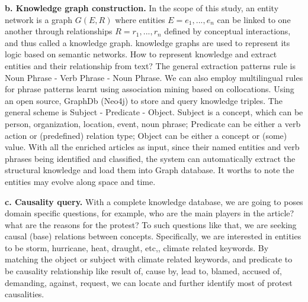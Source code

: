 \documentclass[9pt,twocolumn,twoside]{pnas-new}
\begin{document}
{\textbf{b. Knowledge graph construction.}
In the scope of this study, an entity network is a graph $G(E, R)$ where entities $E = {e_1,
. . ., e_n}$ can be linked to one another through relationships $R = {r_1, . . ., r_n}$ defined by conceptual interactions, and thus called a knowledge graph. knowledge graphs are used to represent its logic based on semantic networks.
How to represent knowledge and extract entities and their relationship from text?
The general extraction patterns rule is Noun Phrase - Verb Phrase - Noun Phrase. We can also employ multilingual rules for phrase patterns learnt using association mining based on collocations. Using an open source, GraphDb (Neo4j) to store and query knowledge triples.
The general scheme is Subject - Predicate - Object. Subject is a concept, which can be person, organization, location, event, noun phrase; Predicate can be either a verb action or (predefined) relation type; Object can be either a concept or (some) value. With all the enriched articles as input, since their named entities and verb phrases being identified and classified, the system can automatically extract the structural knowledge and load them into Graph database. It worths to note the entities may evolve along space and time.

\textbf{c. Causality query.}
With a complete knowledge database, we are going to poses domain specific questions, for example, who are the main players in the article? what are the reasons for the protest? To such questions like that, we are seeking causal (base) relations between concepts. Specifically, we are interested in entities to be storm, hurricane, heat, draught, etc,, climate related keywords. By matching the object or subject with climate related keywords, and predicate to be causality relationship like result of, cause by, lead to, blamed, accused of, demanding, against, request, we can locate and further identify most of protest causalities.

}
\end{document}
